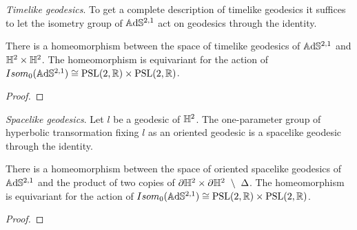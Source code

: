 \noindent\textit{Timelike geodesics}.
To get a complete description of timelike geodesics it suffices to let the isometry group of $\mathbb{A}\mathrm{d}\mathbb{S}^{2,1}$ act on geodesics through the identity.
\begin{proposition}
    There is a homeomorphism between the space of timelike geodesics of $\mathbb{A}\mathrm{d}\mathbb{S}^{2,1}$ and $\mathbb{H}^2 \times \mathbb{H}^2$.
    The homeomorphism is equivariant for the action of $Isom_0(\mathbb{A}\mathrm{d}\mathbb{S}^{2,1}) \cong \text{PSL}(2,\mathbb{R}) \times \text{PSL}(2,\mathbb{R})$.
\end{proposition}
\begin{proof}
\end{proof}

\noindent\textit{Spacelike geodesics}.
Let $l$ be a geodesic of $\mathbb{H}^2$. The one-parameter group of hyperbolic transormation fixing $l$ as an oriented geodesic is a spacelike geodesic through the identity.
\begin{proposition}
    There is a homeomorphism between the space of oriented spacelike geodesics of $\mathbb{A}\mathrm{d}\mathbb{S}^{2,1}$ and the product of two copies of $\partial \mathbb{H}^2 \times \partial \mathbb{H}^2 \ \setminus \ \Delta$. 
    The homeomorphism is equivariant for the action of $Isom_0(\mathbb{A}\mathrm{d}\mathbb{S}^{2,1}) \cong \text{PSL}(2,\mathbb{R}) \times \text{PSL}(2,\mathbb{R})$.
\end{proposition}
\begin{proof}
\end{proof}
